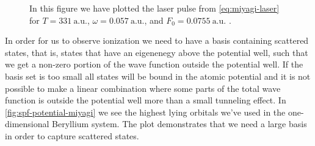             \begin{figure}
                \centering
                \caption{In this figure we have plotted the laser pulse from
                \autoref{eq:miyagi-laser} for $T = \SI{331}{\text{a.u.}}$,
                $\omega = \SI{0.057}{\text{a.u.}}$, and $F_0 =
                \SI{0.0755}{\text{a.u.}}$ \cite{miyagi_and_madsen}.}
                \label{fig:miyagi-laser}
            \end{figure}


            In order for us to observe ionization we need to have a basis
            containing scattered states, that is, states that have an eigenenegy
            above the potential well, such that we get a non-zero portion of the
            wave function outside the potential well.
            If the basis set is too small all states will be bound in the atomic
            potential and it is not possible to make a linear combination where
            some parts of the total wave function is outside the potential well
            more than a small tunneling effect.
            In \autoref{fig:spf-potential-miyagi} we see the highest lying
            orbitals we've used in the one-dimensional Beryllium system.
            The plot demonstrates that we need a large basis in order to capture
            scattered states.

